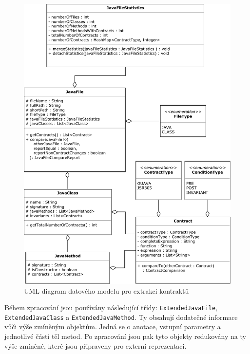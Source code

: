 				
				\begin{figure}[!htb]
						\centering
						\includegraphics[width=1\textwidth]{img/modelExtractorDiagram.pdf}
						\caption[modelExtractorDiagram]{UML diagram datového modelu pro extrakci kontraktů}
						\label{modelExtractorDiagram}
					\endminipage\hfill
				\end{figure}				
					
	
		Během zpracování jsou používány následující třídy: \texttt{ExtendedJavaFile}, \texttt{ExtendedJavaClass} a \texttt{ExtendedJavaMethod}. Ty obsahují dodatečné informace vůči výše zmíněným objektům. Jedná se o anotace, vstupní parametry a jednotlivé části těl metod. Po zpracování jsou pak tyto objekty redukovány na ty výše zmíněné, které jsou připraveny pro externí reprezentaci.
		


